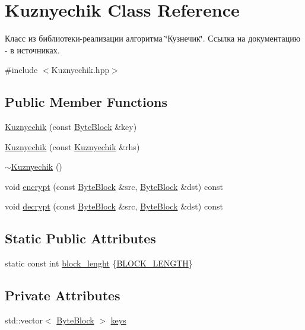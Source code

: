 \hypertarget{class_kuznyechik}{}\section{Kuznyechik Class Reference}
\label{class_kuznyechik}


Класс из библиотеки-\/реализации алгоритма \char`\"{}Кузнечик\char`\"{}. Ссылка на документацию -\/ в источниках.  




{\ttfamily \#include $<$Kuznyechik.\+hpp$>$}

\subsection*{Public Member Functions}
\begin{DoxyCompactItemize}
\item 
\hyperlink{class_kuznyechik_a3fa49cd54a47b9cc2d5a32beabd05264}{Kuznyechik} (const \hyperlink{class_byte_block}{Byte\+Block} \&key)
\item 
\hyperlink{class_kuznyechik_a8e3a616991d823600e38d4a974124d1d}{Kuznyechik} (const \hyperlink{class_kuznyechik}{Kuznyechik} \&rhs)
\item 
\hyperlink{class_kuznyechik_a0dab125f7a2ba66559ee611256985c45}{$\sim$\+Kuznyechik} ()
\item 
void \hyperlink{class_kuznyechik_ace290770ef015f19d6c0e06c66a4f29d}{encrypt} (const \hyperlink{class_byte_block}{Byte\+Block} \&src, \hyperlink{class_byte_block}{Byte\+Block} \&dst) const
\item 
void \hyperlink{class_kuznyechik_a8f699d0a38e8fa9c147d7b31d759bf26}{decrypt} (const \hyperlink{class_byte_block}{Byte\+Block} \&src, \hyperlink{class_byte_block}{Byte\+Block} \&dst) const
\end{DoxyCompactItemize}
\subsection*{Static Public Attributes}
\begin{DoxyCompactItemize}
\item 
static const int \hyperlink{class_kuznyechik_acf61a43f8d6c726b0d334df98bdc0337}{block\+\_\+lenght} \{\hyperlink{_kuznyechik_8hpp_a22a79078d4bc53268ab86f316856248f}{B\+L\+O\+C\+K\+\_\+\+L\+E\+N\+G\+TH}\}
\end{DoxyCompactItemize}
\subsection*{Private Attributes}
\begin{DoxyCompactItemize}
\item 
std\+::vector$<$ \hyperlink{class_byte_block}{Byte\+Block} $>$ \hyperlink{class_kuznyechik_a19e910dc6d7358b07ab733c31ae52b8d}{keys}
\end{DoxyCompactItemize}
